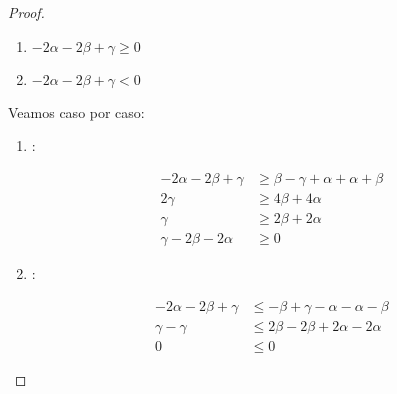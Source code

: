 \begin{proof}
    \begin{enumerate}
      \item $-2\alpha-2\beta+\gamma \geq 0$
      \item $-2\alpha-2\beta+\gamma < 0$
    \end{enumerate}
    Veamos caso por caso:
    \begin{enumerate}
      \item {}:
       
        \begin{equation*}
          \begin{aligned}
          -2\alpha-2\beta+\gamma &\geq \beta - \gamma + \alpha + \alpha + \beta \\
           2\gamma &\geq 4\beta + 4\alpha \\
           \gamma &\geq 2\beta + 2\alpha \\
           \gamma - 2\beta - 2\alpha& \geq 0
          \end{aligned}
        \end{equation*}

      \item {}:

        \begin{equation*}
          \begin{aligned}
           -2\alpha-2\beta+\gamma &\leq -\beta+\gamma-\alpha-\alpha-\beta \\
           \gamma - \gamma &\leq 2\beta - 2\beta + 2\alpha - 2\alpha \\
           0 &\leq 0 
          \end{aligned}
        \end{equation*}


    \end{enumerate}


  \end{proof}

